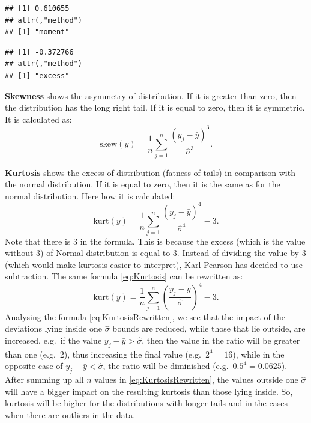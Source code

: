 \documentclass[
]{book}
\newenvironment{Shaded}{\begin{snugshade}}{\end{snugshade}}
\newcommand{\KeywordTok}[1]{\textcolor[rgb]{0.13,0.29,0.53}{\textbf{#1}}}
\newcommand{\NormalTok}[1]{#1}
\newcommand{\OperatorTok}[1]{\textcolor[rgb]{0.81,0.36,0.00}{\textbf{#1}}}
\theoremstyle{definition}
\theoremstyle{definition}
\theoremstyle{definition}
\theoremstyle{definition}
\theoremstyle{remark}
\begin{document}
\begin{verbatim}
## [1] 0.610655
## attr(,"method")
## [1] "moment"
\end{verbatim}

\begin{Shaded}
\end{Shaded}

\begin{verbatim}
## [1] -0.372766
## attr(,"method")
## [1] "excess"
\end{verbatim}

\textbf{Skewness} shows the asymmetry of distribution. If it is greater than zero, then the distribution has the long right tail. If it is equal to zero, then it is symmetric. It is calculated as:
\begin{equation}
    \mathrm{skew}(y)= \frac{1}{n}\sum_{j=1}^n \frac{(y_j - \bar{y})^3}{\hat{\sigma}^3} .
    \label{eq:Skewness}
\end{equation}

\textbf{Kurtosis} shows the excess of distribution (fatness of tails) in comparison with the normal distribution. If it is equal to zero, then it is the same as for the normal distribution. Here how it is calculated:
\begin{equation}
    \mathrm{kurt}(y)= \frac{1}{n}\sum_{j=1}^n \frac{(y_j - \bar{y})^4}{\hat{\sigma}^4} - 3 .
    \label{eq:Kurtosis}
\end{equation}
Note that there is \(3\) in the formula. This is because the excess (which is the value without 3) of Normal distribution is equal to 3. Instead of dividing the value by 3 (which would make kurtosis easier to interpret), Karl Pearson has decided to use subtraction. The same formula \eqref{eq:Kurtosis} can be rewritten as:
\begin{equation}
    \mathrm{kurt}(y)= \frac{1}{n}\sum_{j=1}^n \left(\frac{y_j - \bar{y}}{\hat{\sigma}}\right)^4 - 3 .
    \label{eq:KurtosisRewritten}
\end{equation}
Analysing the formula \eqref{eq:KurtosisRewritten}, we see that the impact of the deviations lying inside one \(\hat{\sigma}\) bounds are reduced, while those that lie outside, are increased. e.g.~if the value \(y_j - \bar{y} > \hat{\sigma}\), then the value in the ratio will be greater than one (e.g.~2), thus increasing the final value (e.g.~\(2^4=16\)), while in the opposite case of \(y_j - \bar{y} < \hat{\sigma}\), the ratio will be diminished (e.g.~\(0.5^4 = 0.0625\)). After summing up all \(n\) values in \eqref{eq:KurtosisRewritten}, the values outside one \(\hat{\sigma}\) will have a bigger impact on the resulting kurtosis than those lying inside. So, kurtosis will be higher for the distributions with longer tails and in the cases when there are outliers in the data.
\end{document}
